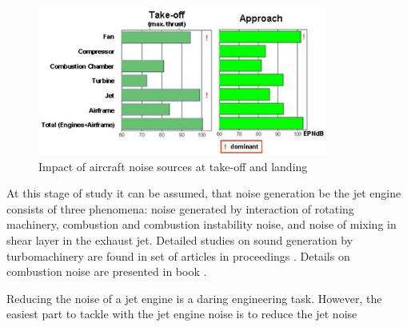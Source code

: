 \begin{figure}[h!]
\centering %
\includegraphics[width=0.85\textwidth]{Pictures/traub2.png}
\caption{Impact of aircraft noise sources at take-off and landing \citep{traub}}
\label{traub2}
\end{figure}

At this stage of study it can be assumed, that noise generation be the jet engine consists of three phenomena: noise generated by interaction of rotating machinery, combustion and combustion instability noise, and noise of mixing in shear layer in the exhaust jet. Detailed studies on sound generation by turbomachinery are found in set of articles in proceedings \cite{tonal}. Details on combustion noise are presented in book \citep{combustion}.

Reducing the noise of a jet engine is a daring engineering task. However, the easiest part to tackle with the jet engine noise is to reduce the jet noise 